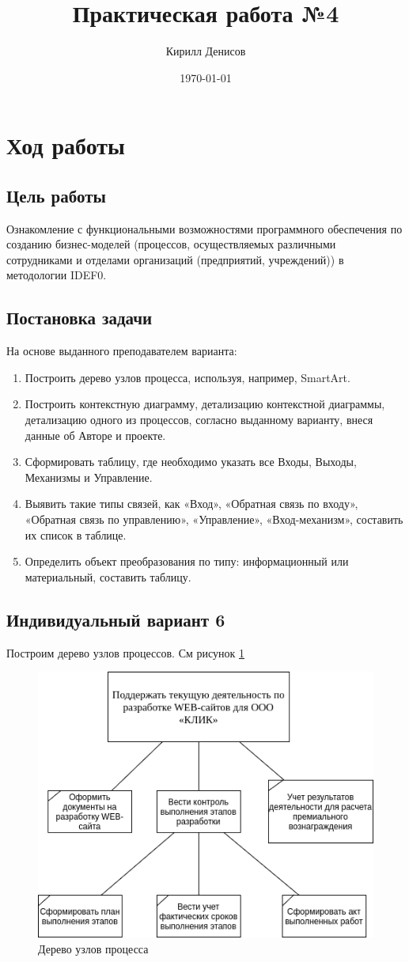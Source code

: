 \documentclass[a4paper,14pt]{extarticle}
\author{Кирилл Денисов}
\title{Практическая работа №4}
\date{\today}
\newcommand{\pathToCommonFolder}{/home/denilai/Documents/repos/latex/Common}
\begin{document}
	\thispagestyle{empty}
	
	\newpage
	\newpage
	\section{Ход работы}
	
	\subsection*{Цель работы}
	Ознакомление с функциональными возможностями
	программного обеспечения по созданию бизнес-моделей (процессов,
	осуществляемых различными сотрудниками и отделами организаций
	(предприятий, учреждений)) в методологии IDEF0.
	
	\subsection*{Постановка задачи}
	На основе выданного преподавателем варианта:
	\begin{enumerate}
	\item Построить дерево узлов процесса, используя, например, SmartArt.
	\item Построить контекстную диаграмму, детализацию контекстной
	диаграммы, детализацию одного из процессов, согласно выданному
	варианту, внеся данные об Авторе и проекте.
	\item Сформировать таблицу, где необходимо указать все Входы, Выходы,
	Механизмы и Управление.
	\item Выявить такие типы связей, как «Вход», «Обратная связь по входу»,
	«Обратная связь по управлению», «Управление», «Вход-механизм»,
	составить их список в таблице.
	\item Определить объект преобразования по типу: информационный или
	материальный, составить таблицу.
	\end{enumerate} 

	\subsection*{Индивидуальный вариант 6}
	\problem Построим дерево узлов процессов. См рисунок \ref{fig:tree}
	\newpage
	\begin{figure}[htpb]
		\centering
		\includegraphics[width=0.5\linewidth]{images/tree}
		\caption{Дерево узлов процесса}
		\label{fig:tree}
	\end{figure} 
\end{document}
